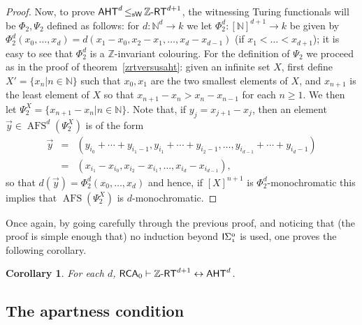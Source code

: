 \documentclass[11pt]{amsart}
\newcommand{\zrt}{\mathnormal{\mathbb Z\text{-}\mathsf{RT}}}
\newcommand{\aht}{\mathnormal{\mathsf{AHT}}}
\newcommand{\rca}{\mathnormal{\mathsf{RCA}}_0}
\newcommand{\weisleq}{\mathop{\leq_{\mathrm{s}\mathsf{W}}}}
\newcommand{\isigma}{\mathnormal{\mathsf{I}\mathrm{\Sigma}_1^0}}
\DeclareMathOperator{\afs}{AFS}
\newtheorem{corollary}[theorem]{Corollary}
\theoremstyle{definition}
\begin{document}
\begin{proof}
Now, to prove $\aht^d\weisleq\zrt^{d+1}$, the witnessing Turing functionals will be $\Phi_2,\Psi_2$ defined as follows: for $d:\mathbb N^d\longrightarrow k$ we let $\Phi_2^d:[\mathbb N]^{d+1}\longrightarrow k$ be given by $\Phi_2^d(x_0,\ldots,x_d)=d(x_1-x_0,x_2-x_1,\ldots,x_d-x_{d-1})$ (if $x_1<\ldots<x_{d+1}$); it is easy to see that $\Phi_2^d$ is a $\mathbb Z$-invariant colouring. For the definition of $\Psi_2$ we proceed as in the proof of theorem~\ref{zrtversusaht}: given an infinite set $X$, first define $X'=\{x_n\big|n\in\mathbb N\}$ such that $x_0,x_1$ are the two smallest elements of $X$, and $x_{n+1}$ is the least element of $X$ so that $x_{n+1}-x_n>x_n-x_{n-1}$ for each $n\geq 1$. We then let $\Psi_2^X=\{x_{n+1}-x_n\big|n\in\mathbb N\}$. Note that, if $y_j=x_{j+1}-x_j$, then an element $\vec{y}\in\afs^d(\Psi_2^X)$ is of the form
\begin{eqnarray*}
\vec{y} & = & (y_{i_0}+\cdots+y_{i_{1}-1},y_{i_1}+\cdots+y_{i_2-1},\ldots,y_{i_{d-1}}+\cdots+y_{i_d-1}) \\
& = & (x_{i_1}-x_{i_0},x_{i_2}-x_{i_1},\ldots,x_{i_d}-x_{i_{d-1}}), 
\end{eqnarray*}
so that $d(\vec{y})=\Phi_2^d(x_0,\ldots,x_d)$ and hence, if $[X]^{n+1}$ is $\Phi_2^d$-monochromatic this implies that $\afs(\Psi_2^X)$ is $d$-monochromatic.
\end{proof}

Once again, by going carefully through the previous proof, and noticing that (the proof is simple enough that) no induction beyond $\isigma$ is used, one proves the following corollary.

\begin{corollary}
For each $d$, $\rca\vdash\zrt^{d+1}\leftrightarrow\aht^d$.
\end{corollary}

\subsection{The apartness condition}
\end{document}
